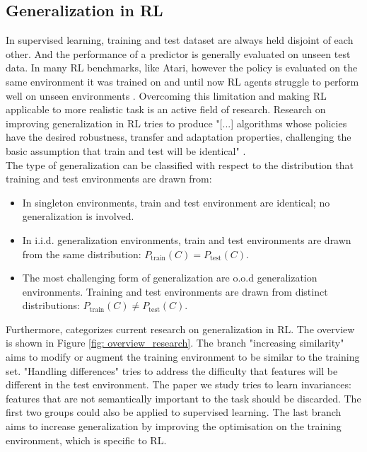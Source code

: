 \documentclass{usiinftr}
\begin{document}
\subsection{Generalization in RL}
In supervised learning, training and test dataset are always held disjoint of each other.
And the performance of a predictor is generally evaluated on unseen test data.
In many RL benchmarks, like Atari, however the policy is evaluated on the same environment it was trained on and until now RL agents struggle to perform well on unseen environments \cite{lee2020network}.
Overcoming this limitation and making RL applicable to more realistic task is an active field of research.
Research on improving generalization in RL tries to produce "[...] algorithms whose policies have the desired
robustness, transfer and adaptation properties, challenging the basic assumption that train and test will be identical" \cite{kirk2021survey}.
\\
The type of generalization can be classified with respect to the distribution that training and test environments are drawn from: \cite{kirk2021survey}
\begin{itemize}
\item In singleton environments, train and test environment are identical; no generalization is involved.
\item In i.i.d. generalization environments, train and test environments are drawn from the same distribution: $P_{\text{train}} (C) = P_{\text{test}}(C)$.
\item The most challenging form of generalization are o.o.d generalization environments. Training and test environments are drawn from distinct distributions: $P_{\text{train}} (C) \neq P_{\text{test}}(C)$.
\end{itemize}
Furthermore, \cite{kirk2021survey} categorizes current research on generalization in RL.
The overview is shown in Figure \ref{fig: overview_research}. 
The branch "increasing similarity" aims to modify or augment the training environment to be similar to the training set.
"Handling differences" tries to address the difficulty that features will be different in the test environment. The paper we study tries to learn invariances: features that are not semantically important to the task should be discarded.
The first two groups could also be applied to supervised learning. The last branch aims to increase generalization by improving the optimisation on the training environment, which is specific to RL.
\end{document}
